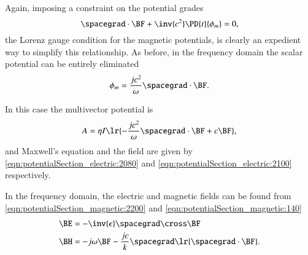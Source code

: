Again, imposing a constraint on the potential grades
\begin{dmath}\label{eqn:potentialSection_magnetic:2180}
\spacegrad \cdot \BF
+ \inv{c^2}
\PD{t}{\phi_m}
= 0,
\end{dmath}
the Lorenz gauge condition for the magnetic potentials, is clearly an expedient way to simplify this relationship.
As before, in the frequency domain the scalar potential can be entirely eliminated
\begin{dmath}\label{eqn:potentialSection_magnetic:2200}
\phi_m = \frac{j c^2}{\omega} \spacegrad \cdot \BF.
\end{dmath}

In this case the
multivector potential is
\begin{dmath}\label{eqn:potentialSection_magnetic:2220}
A =
\eta I \lr{
-\frac{j c^2}{\omega} \spacegrad \cdot \BF + c \BF
},
\end{dmath}
and Maxwell's equation and the field are given by
\cref{eqn:potentialSection_electric:2080} and
\cref{eqn:potentialSection_electric:2100} respectively.

In the frequency domain, the electric and magnetic fields can be found from
\cref{eqn:potentialSection_magnetic:2200} and \cref{eqn:potentialSection_magnetic:140}
\begin{dmath}\label{eqn:potentialSection_magnetic:2540}
\begin{aligned}
\BE &= -\inv{\epsilon} \spacegrad \cross \BF \\
\BH &=
- j \omega \BF
-\frac{j c}{k} \spacegrad \lr{ \spacegrad \cdot \BF }
.
\end{aligned}
\end{dmath}

%
%
